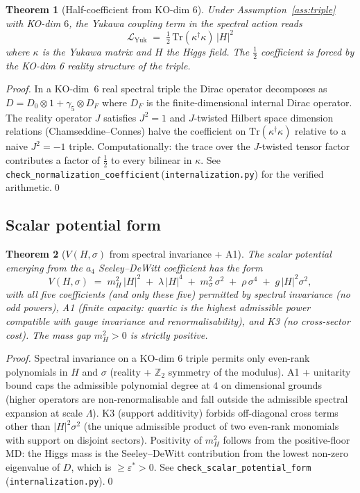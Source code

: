 \documentclass[11pt,a4paper]{article}
\newtheorem{theorem}{Theorem}[section]
\theoremstyle{definition}
\newcommand{\epsstar}{\varepsilon^{\ast}}
\newcommand{\Tr}{\mathrm{Tr}}
\newcommand{\coderef}[2]{\texttt{#1}\,(\texttt{#2})}
\begin{document}
\begin{theorem}[Half-coefficient from KO-dim 6]
\label{thm:halfcoeff}
Under Assumption~\ref{ass:triple} with KO-dim $6$, the Yukawa coupling term in the spectral action reads
\[
   \mathcal{L}_{\mathrm{Yuk}} \;=\; \tfrac{1}{2}\,\Tr(\kappa^\dagger\kappa)\,|H|^2
\]
where $\kappa$ is the Yukawa matrix and $H$ the Higgs field.  The $\tfrac12$ coefficient is forced by the KO-dim 6 reality structure of the triple.
\end{theorem}

\begin{proof}
In a KO-dim~6 real spectral triple the Dirac operator decomposes as $D=D_0\otimes 1+\gamma_5\otimes D_F$ where $D_F$ is the finite-dimensional internal Dirac operator.  The reality operator $J$ satisfies $J^2=1$ and $J$-twisted Hilbert space dimension relations (Chamseddine--Connes) halve the coefficient on $\Tr(\kappa^\dagger\kappa)$ relative to a naive $J^2=-1$ triple.  Computationally: the trace over the $J$-twisted tensor factor contributes a factor of $\tfrac12$ to every bilinear in $\kappa$.  See \coderef{check\_normalization\_coefficient}{internalization.py} for the verified arithmetic.\qed
\end{proof}

\subsection{Scalar potential form}

\begin{theorem}[$V(H,\sigma)$ from spectral invariance + A1]
\label{thm:Vform}
The scalar potential emerging from the $a_4$ Seeley--DeWitt coefficient has the form
\[
   V(H,\sigma) \;=\; m_H^2\,|H|^2 \;+\; \lambda\,|H|^4 \;+\; m_\sigma^2\,\sigma^2 \;+\; \rho\,\sigma^4 \;+\; g\,|H|^2\sigma^2,
\]
with all five coefficients (and only these five) permitted by spectral invariance (no odd powers), A1 (finite capacity: quartic is the highest admissible power compatible with gauge invariance and renormalisability), and K3 (no cross-sector cost).  The mass gap $m_H^2>0$ is strictly positive.
\end{theorem}

\begin{proof}
Spectral invariance on a KO-dim 6 triple permits only even-rank polynomials in $H$ and $\sigma$ (reality + $\mathbb{Z}_2$ symmetry of the modulus).  A1 + unitarity bound caps the admissible polynomial degree at $4$ on dimensional grounds (higher operators are non-renormalisable and fall outside the admissible spectral expansion at scale $\Lambda$).  K3 (support additivity) forbids off-diagonal cross terms other than $|H|^2\sigma^2$ (the unique admissible product of two even-rank monomials with support on disjoint sectors).  Positivity of $m_H^2$ follows from the positive-floor MD: the Higgs mass is the Seeley--DeWitt contribution from the lowest non-zero eigenvalue of $D$, which is $\geq\epsstar>0$.  See \coderef{check\_scalar\_potential\_form}{internalization.py}.\qed
\end{proof}
\end{document}
